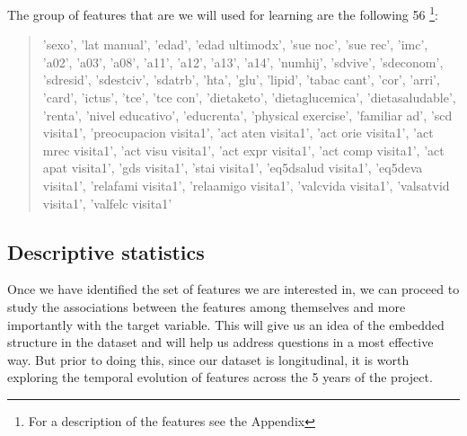 \documentclass[11pt]{article}
\begin{document}
The group of features that are we will used for learning are the following 56 \footnote{For a description of the features see the Appendix}: 
\begin{quote}
'sexo', 'lat manual', 'edad', 'edad ultimodx', 'sue noc', 'sue rec', 'imc', 'a02', 'a03', 'a08', 'a11', 'a12', 'a13', 'a14', 'numhij', 'sdvive', 'sdeconom', 'sdresid', 'sdestciv', 'sdatrb', 'hta', 'glu', 'lipid', 'tabac cant', 'cor', 'arri', 'card', 'ictus', 'tce', 'tce con', 'dietaketo', 'dietaglucemica', 'dietasaludable', 'renta', 'nivel educativo', 'educrenta', 'physical exercise', 'familiar ad', 'scd visita1', 'preocupacion visita1', 'act aten visita1', 'act orie visita1', 'act mrec visita1', 'act visu visita1', 'act expr visita1', 'act comp visita1', 'act apat visita1', 'gds visita1', 'stai visita1', 'eq5dsalud visita1', 'eq5deva visita1', 'relafami visita1', 'relaamigo visita1', 'valcvida visita1', 'valsatvid visita1', 'valfelc visita1'
\end{quote}

\subsection{Descriptive statistics}
\label{sse:des}

Once we have identified the set of features we are interested in, we can proceed to study the associations between the features among themselves and more importantly with the target variable. This will give us an idea of the embedded structure in the dataset and will help us address questions in a most effective way. But prior to doing this, since our dataset is longitudinal, it is worth exploring the temporal evolution of features across the 5 years of the project.
\end{document}
